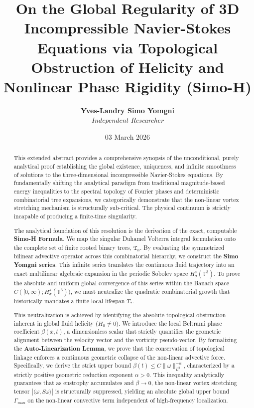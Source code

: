 \documentclass[12pt,a4paper]{article}
\title{\textbf{On the Global Regularity of 3D Incompressible Navier-Stokes Equations via Topological Obstruction of Helicity and Nonlinear Phase Rigidity (Simo-H)}}
\author{\textbf{Yves-Landry Simo Yomgni} \\ \textit{Independent Researcher}}
\date{03 March 2026}
\theoremstyle{plain}
\theoremstyle{definition}
\theoremstyle{remark}
\begin{document}
\maketitle

\begin{abstract}
This extended abstract provides a comprehensive synopsis of the unconditional, purely analytical proof establishing the global existence, uniqueness, and infinite smoothness of solutions to the three-dimensional incompressible Navier-Stokes equations. By fundamentally shifting the analytical paradigm from traditional magnitude-based energy inequalities to the spectral topology of Fourier phases and deterministic combinatorial tree expansions, we categorically demonstrate that the non-linear vortex stretching mechanism is structurally sub-critical. The physical continuum is strictly incapable of producing a finite-time singularity.

The analytical foundation of this resolution is the derivation of the exact, computable \textbf{Simo-H Formula}. We map the singular Duhamel Volterra integral formulation onto the complete set of finite rooted binary trees, $\mathfrak{T}_n$. By evaluating the symmetrized bilinear advective operator across this combinatorial hierarchy, we construct the \textbf{Simo Yomgni series}. This infinite series translates the continuous fluid trajectory into an exact multilinear algebraic expansion in the periodic Sobolev space $H^s_\sigma(\mathbb{T}^3)$. To prove the absolute and uniform global convergence of this series within the Banach space $C([0,\infty); H^s_\sigma(\mathbb{T}^3))$, we must neutralize the quadratic combinatorial growth that historically mandates a finite local lifespan $T_*$.

This neutralization is achieved by identifying the absolute topological obstruction inherent in global fluid helicity ($H_0 \neq 0$). We introduce the local Beltrami phase coefficient $\beta(x,t)$, a dimensionless scalar that strictly quantifies the geometric alignment between the velocity vector and the vorticity pseudo-vector. By formalizing the \textbf{Auto-Linearization Lemma}, we prove that the conservation of topological linkage enforces a continuous geometric collapse of the non-linear advective force. Specifically, we derive the strict upper bound $\beta(t) \leq C \|\omega\|_{L^2}^{-\alpha}$, characterized by a strictly positive geometric reduction exponent $\alpha > 0$. This inequality analytically guarantees that as enstrophy accumulates and $\beta \to 0$, the non-linear vortex stretching tensor $|\langle \omega, S\omega \rangle|$ is structurally suppressed, yielding an absolute global upper bound $\Gamma_{\max}$ on the non-linear convective term independent of high-frequency localization.


\end{abstract}
\end{document}
